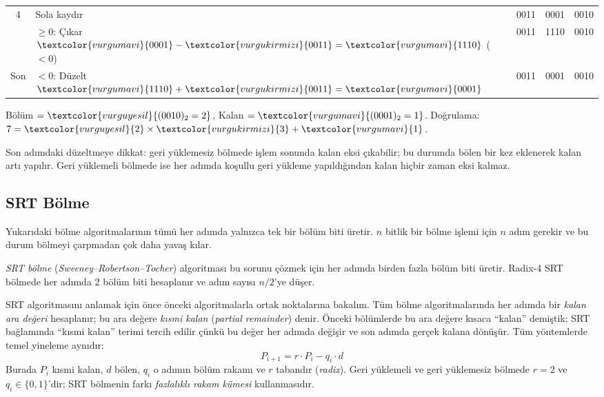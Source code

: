 \begin{ornek}[5.13]
\begin{center}
{\begin{tabular}{c l c c c}
\midrule
4 & Sola kaydır & \textcolor{vurgukirmizi}{0011} & \textcolor{vurgumavi}{0001} & \textcolor{vurguyesil}{0010} \\
  & $\geq 0$: Çıkar $\textcolor{vurgumavi}{0001} - \textcolor{vurgukirmizi}{0011} = \textcolor{vurgumavi}{1110}$ ($<0$) & \textcolor{vurgukirmizi}{0011} & \textcolor{vurgumavi}{1110} & \textcolor{vurguyesil}{0010} \\
\midrule
Son & $< 0$: Düzelt $\textcolor{vurgumavi}{1110} + \textcolor{vurgukirmizi}{0011} = \textcolor{vurgumavi}{0001}$ & \textcolor{vurgukirmizi}{0011} & \textcolor{vurgumavi}{0001} & \textcolor{vurguyesil}{0010} \\
\bottomrule
\end{tabular}}%
\end{center}

Bölüm $= \textcolor{vurguyesil}{(0010)_2 = 2}$, \quad Kalan $= \textcolor{vurgumavi}{(0001)_2 = 1}$. Doğrulama: $7 = \textcolor{vurguyesil}{2} \times \textcolor{vurgukirmizi}{3} + \textcolor{vurgumavi}{1}$.\;\checkmark

Son adımdaki düzeltmeye dikkat: geri yüklemesiz bölmede işlem sonunda kalan eksi çıkabilir; bu durumda bölen bir kez eklenerek kalan artı yapılır. Geri yüklemeli bölmede ise her adımda koşullu geri yükleme yapıldığından kalan hiçbir zaman eksi kalmaz.
\end{ornek}

\subsection{SRT Bölme}
\label{sec:srt-bolme}

Yukarıdaki bölme algoritmalarının tümü her adımda yalnızca tek bir bölüm biti üretir. $n$ bitlik bir bölme işlemi için $n$ adım gerekir ve bu durum bölmeyi çarpmadan çok daha yavaş kılar.

\emph{SRT bölme} (\emph{Sweeney--Robertson--Tocher}) algoritması bu sorunu çözmek için her adımda birden fazla bölüm biti üretir. Radix-4 SRT bölmede her adımda 2 bölüm biti hesaplanır ve adım sayısı $n/2$'ye düşer.

SRT algoritmasını anlamak için önce önceki algoritmalarla ortak noktalarına bakalım. Tüm bölme algoritmalarında her adımda bir \emph{kalan ara değeri} hesaplanır; bu ara değere \emph{kısmi kalan} (\emph{partial remainder}) denir. Önceki bölümlerde bu ara değere kısaca ``kalan'' demiştik; SRT bağlamında ``kısmi kalan'' terimi tercih edilir çünkü bu değer her adımda değişir ve son adımda gerçek kalana dönüşür. Tüm yöntemlerde temel yineleme aynıdır:
\[
P_{i+1} = r \cdot P_i - q_i \cdot d
\]
Burada $P_i$ kısmi kalan, $d$ bölen, $q_i$ o adımın bölüm rakamı ve $r$ tabandır (\emph{radix}). Geri yüklemeli ve geri yüklemesiz bölmede $r = 2$ ve $q_i \in \{0, 1\}$'dir; SRT bölmenin farkı \emph{fazlalıklı rakam kümesi} kullanmasıdır.

